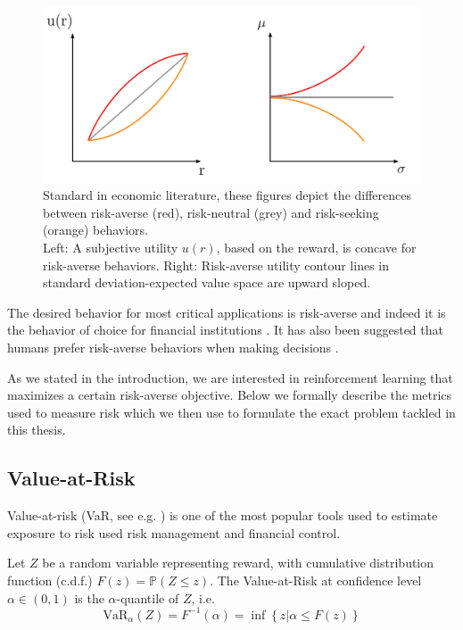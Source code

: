 \begin{figure}
\center
\includegraphics[width=0.8\linewidth]{gfx/risk.pdf}
\caption[Comparison of risk-sensitive behaviors.]{Standard in economic literature, these figures depict the differences between risk-averse (red), risk-neutral (grey) and risk-seeking (orange) behaviors.\\
Left: A subjective utility $u(r)$, based on the reward, is concave for risk-averse behaviors. 
Right: Risk-averse utility contour lines in standard deviation-expected value space are upward sloped.
}
\label{fig:risk}
\end{figure}

The desired behavior for most critical applications is risk-averse and indeed it is the behavior of choice for financial institutions \citep{wipplinger2007philippe, basel2013fundamental}. It has also been suggested that humans prefer risk-averse behaviors when making decisions \citep{shen2014risk}.

As we stated in the introduction, we are interested in reinforcement learning that maximizes a certain risk-averse objective. Below we formally describe the metrics used to measure risk which we then use to formulate the exact problem tackled in this thesis.

\subsection{Value-at-Risk}

Value-at-risk (VaR, see e.g. \citet{wipplinger2007philippe}) is one of the most popular tools used to estimate exposure to risk used risk management and financial control.

Let $Z$ be a random variable representing reward, with cumulative distribution function (c.d.f.) $F(z) = \mathbb{P}(Z \le z)$.
The Value-at-Risk  at confidence level $\alpha \in (0,1)$ is the $\alpha$-quantile of $Z$, i.e. 
\begin{equation}
\text{VaR}_\alpha(Z)=F^{-1}(\alpha)=\inf\left\lbrace z | \alpha \le F(z) \right\rbrace
\end{equation}

